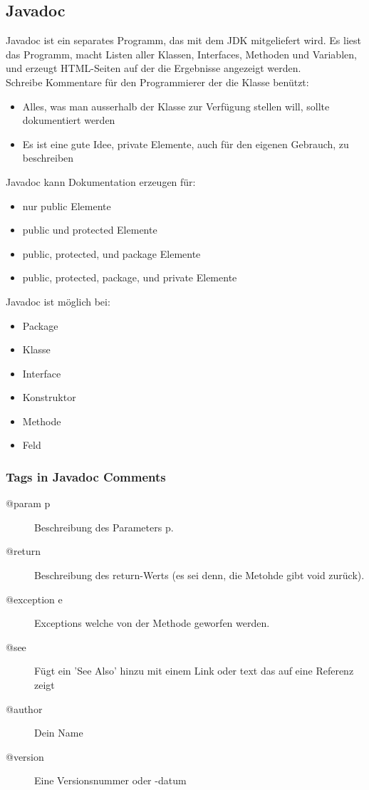 \documentclass[a4paper,10pt]{article}
\begin{document}
\subsection{Javadoc}
Javadoc ist ein separates Programm, das mit dem JDK mitgeliefert wird. Es liest das Programm, macht Listen aller Klassen, Interfaces, Methoden und Variablen, und erzeugt HTML-Seiten auf der die Ergebnisse angezeigt werden. \\
Schreibe Kommentare für den Programmierer der die Klasse benützt: 
\begin{itemize}
	\item Alles, was man ausserhalb der Klasse zur Verfügung stellen will, sollte dokumentiert werden
	\item Es ist eine gute Idee, private Elemente, auch für den eigenen Gebrauch, zu beschreiben
\end{itemize}
Javadoc kann Dokumentation erzeugen für:
\begin{itemize}
	\item nur public Elemente
	\item public und protected Elemente
	\item public, protected, und package Elemente
	\item public, protected, package, und private Elemente
\end{itemize}
Javadoc ist möglich bei:
\begin{itemize}
	\item Package
	\item Klasse
	\item Interface
	\item Konstruktor
	\item Methode	
	\item Feld
\end{itemize}

\subsubsection{Tags in Javadoc Comments}
\begin{description}
	\item[@param p]			Beschreibung des Parameters p.
	\item[@return] 			Beschreibung des return-Werts (es sei denn, die Metohde gibt void zurück).
	\item[@exception e] Exceptions welche von der Methode geworfen werden.
	\item[@see] 				Fügt ein 'See Also' hinzu mit einem Link oder text das auf eine Referenz zeigt
	\item[@author]			Dein Name
	\item[@version] 		Eine Versionsnummer oder -datum
\end{description}
\end{document}
